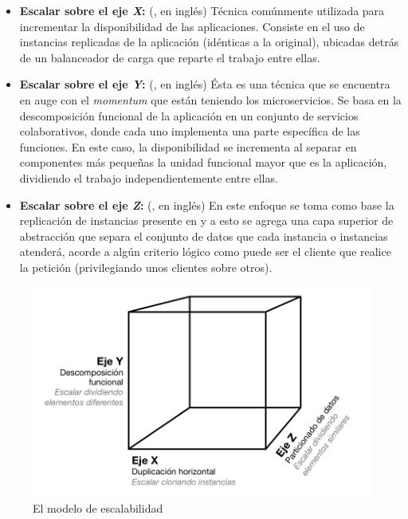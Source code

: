 \begin{itemize}
  \item \textbf{Escalar sobre el eje \textit{X}:} (, en inglés) Técnica comúnmente utilizada para incrementar la disponibilidad de las aplicaciones. Consiste en el uso de instancias replicadas de la aplicación (idénticas a la original), ubicadas detrás de un balanceador de carga que reparte el trabajo entre ellas.
  \item \textbf{Escalar sobre el eje \textit{Y}:} (, en inglés) Ésta es una técnica que se encuentra en auge con el \textit{momentum} que están teniendo los microservicios. Se basa en la descomposición funcional de la aplicación en un conjunto de servicios colaborativos, donde cada uno implementa una parte específica de las funciones. En este caso, la disponibilidad se incrementa al separar en componentes más pequeñas la unidad funcional mayor que es la aplicación, dividiendo el trabajo independientemente entre ellas.
  \item \textbf{Escalar sobre el eje \textit{Z}:} (, en inglés) En este enfoque se toma como base la replicación de instancias presente en  y a esto se agrega una capa superior de abstracción que separa el conjunto de datos que cada instancia o instancias atenderá, acorde a algún criterio lógico como puede ser el cliente que realice la petición (privilegiando unos clientes sobre otros).
\end{itemize}

\begin{figure}
  \includegraphics[width=\linewidth]{src/images/04-capitulo-4/scale-cube.png}
  \caption{El modelo de escalabilidad }
  \label{fig:scale-cube}
\end{figure}


